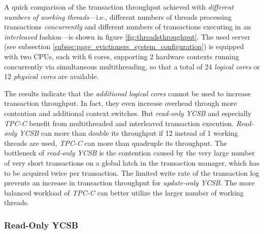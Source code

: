     A quick comparison of the transaction throughput achieved with \emph{different numbers of working threads}---i.e., different numbers of threads processing transactions \emph{concurrently} and different numbers of transactions executing in an \emph{interleaved} fashion---is shown in figure \ref{fig:threadsthroughput}. The used server (see subsection \ref{subsec:page_evictioners_system_configuration}) is equipped with two CPUs, each with 6 cores, supporting 2 hardware contexts running concurrently via simultaneous multithreading, so that a total of 24 \emph{logical cores} or 12 \emph{physical cores} are available.

    The results indicate that the \emph{additional logical cores} cannot be used to increase transaction throughput. In fact, they even increase overhead through more contention and additional context switches. But \emph{read-only} \textit{YCSB} and especially \textit{TPC-C} benefit from multithreaded and interleaved transaction execution. \emph{Read-only} \textit{YCSB} can more than double its throughput if 12 instead of 1 working threads are used, \textit{TPC-C} can more than quadruple its throughput. The bottleneck of \emph{read-only} \textit{YCSB} is the contention caused by the very large number of very short transactions on a global latch in the transaction manager, which has to be acquired twice per transaction. The limited write rate of the transaction log prevents an increase in transaction throughput for \emph{update-only} \textit{YCSB}. The more balanced workload of \textit{TPC-C} can better utilize the larger number of working threads.

\subsubsection{Read-Only YCSB} \label{subsubsec:looking_glass_single_threaded_read_only_ycsb}

